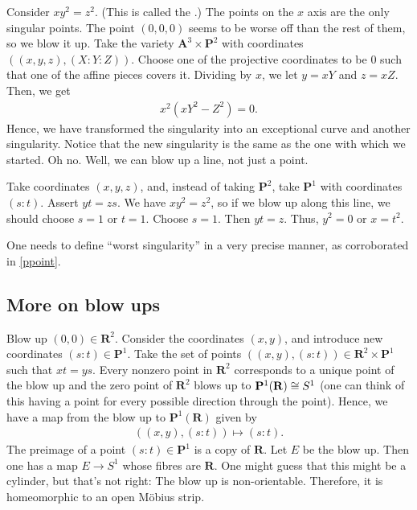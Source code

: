 \documentclass[11pt, oneside,margin=1in]{article}
\begin{document}
\begin{example}\label{ppoint}\text{}
Consider $xy^2=z^2$. (This is called the .) The points on the $x$ axis are the only singular points. The point $(0,0,0)$ seems to be worse off than the rest of them, so we blow it up. Take the variety $\mathbf{A}^3 \times \mathbf{P}^2$ with coordinates $((x,y,z),  (X:Y:Z))$. Choose one of the projective coordinates to be $0$ such that one of the affine pieces covers it. Dividing by $x$, we let $y=xY$ and $z=xZ$. Then, we get
\begin{align*}
	x^2(xY^2-Z^2)=0.
\end{align*}
Hence, we have transformed the singularity into an exceptional curve and another singularity. Notice that the new singularity is the same as the one with which we started. Oh no. Well, we can blow up a line, not just a point.

Take coordinates $(x,y,z)$, and, instead of taking $\mathbf{P}^2$, take $\mathbf{P}^1$ with coordinates $(s:t)$. Assert $yt=zs$. We have $xy^2=z^2$, so if we blow up along this line, we should choose $s=1$ or $t=1$. Choose $s=1$. Then $yt=z$. Thus, $y^2=0$ or $x=t^2$.
\end{example}

\begin{warn}
	One needs to define ``worst singularity'' in a very precise manner, as corroborated in \cref{ppoint}. 
\end{warn}

\subsection{More on blow ups}
\begin{example}\label{}\text{}
Blow up $(0,0)\in  \mathbf{R}^2$. Consider the coordinates $(x,y)$, and introduce new coordinates $(s:t) \in \mathbf{P}^1$. Take the set of points $((x,y), (s:t)) \in \mathbf{R}^2\times \mathbf{P}^1$ such that $xt=ys$. Every nonzero point in $\mathbf{R}^2$ corresponds to a unique point of the blow up and the zero point of $\mathbf{R}^2$ blows up to $\mathbf{P}^1(\mathbf{R})\cong S^1$  (one can think of this having a point for every possible direction through the point). Hence, we have a map from the blow up to $\mathbf{P}^1(\mathbf{R})$ given by
\begin{align*}
	((x,y),  (s:t)) \longmapsto (s:t).
\end{align*}
The preimage of a point $(s:t) \in \mathbf{P}^1$ is a copy of $\mathbf{R}$. Let $E$ be the blow up. Then one has a map $E\longrightarrow S^1$ whose fibres are $\mathbf{R}$. One might guess that this might be a cylinder, but that's not right: The blow up is non-orientable. Therefore, it is homeomorphic to an open M\"obius strip. 
\end{example}
\end{document}
